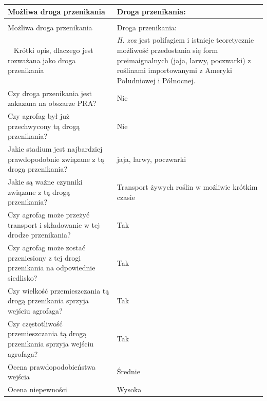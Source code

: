 \documentclass[polish,a4paper]{article}
\begin{document}
\begin{longtabu} to 
\toprule
{}  \textbf{Możliwa droga przenikania} & \textbf{Droga przenikania:}\\
\midrule
\endfirsthead
{}\\
\toprule
Możliwa droga przenikania & Droga przenikania:\\
\midrule
\endhead
\
\endfoot
\bottomrule
\endlastfoot
Krótki opis, dlaczego jest rozważana jako droga przenikania & \textit{H. zea} jest polifagiem i istnieje teoretycznie możliwość przedostania się form preimaignalnych (jaja, larwy, poczwarki) z roślinami importowanymi z Ameryki Południowej i Północnej.\\
Czy droga przenikania jest zakazana na obszarze PRA? & Nie\\
Czy agrofag był już przechwycony tą drogą przenikania? & Nie\\
Jakie stadium jest najbardziej prawdopodobnie związane z tą drogą przenikania? & jaja, larwy, poczwarki\\
Jakie są ważne czynniki związane z tą drogą przenikania? & Transport żywych roślin w możliwie krótkim czasie\\
Czy agrofag może przeżyć transport i składowanie w tej drodze przenikania? & Tak\\
Czy agrofag może zostać przeniesiony z tej drogi przenikania na odpowiednie siedlisko? & Tak\\
Czy wielkość przemieszczania tą drogą przenikania sprzyja wejściu agrofaga? & Tak\\
Czy częstotliwość przemieszczania tą drogą przenikania sprzyja wejściu agrofaga? & Tak\\
Ocena prawdopodobieństwa wejścia & Średnie\\
\cmidrule{1-2}
Ocena niepewności & Wysoka\\*
\end{longtabu}
\end{document}
